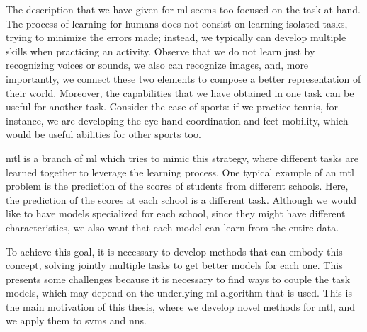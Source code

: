 The description that we have given for \acrshort{ml} seems too focused on the task at hand. The process of learning for humans does not consist on learning isolated tasks, trying to minimize the errors made; instead, we typically can develop multiple skills when practicing an activity. Observe that we do not learn just by recognizing voices or sounds, we also can recognize images, and, more importantly, we connect these two elements to compose a better representation of their world.
Moreover, the capabilities that we have obtained in one task can be useful for another task. Consider the case of sports: if we practice tennis, for instance, we are developing the eye-hand coordination and feet mobility, which would be useful abilities for other sports too.
%

\acrfull{mtl} is a branch of \acrshort{ml} which tries to mimic this strategy, where different tasks are learned together to leverage the learning process. 
One typical example of an \acrshort{mtl} problem is the prediction of the scores of students from different schools. Here, the prediction of the scores at each school is a different task. 
%
Although we would like to have models specialized for each school, since they might have different characteristics, we also want that each model can learn from the entire data. 
%

To achieve this goal, it is necessary to develop methods that can embody this concept, solving jointly multiple tasks to get better models for each one. This presents some challenges because it is necessary to find ways to couple the task models, which may depend on the underlying \acrshort{ml} algorithm that is used. 
This is the main motivation of this thesis, where we develop novel methods for \acrshort{mtl}, and we apply them to \acrshort{svms} and \acrshort{nns}.









